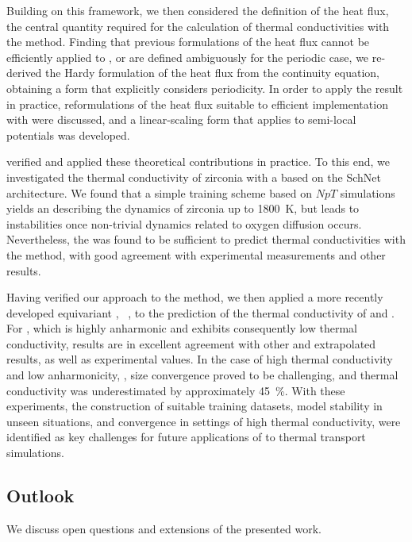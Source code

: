 Building on this framework, we then considered the definition of the heat flux, the central quantity required for the calculation of thermal conductivities with the \gk method.
Finding that previous formulations of the heat flux cannot be efficiently applied to \glps, or are defined ambiguously for the periodic case, we re-derived the Hardy formulation of the heat flux from the continuity equation, obtaining a form that explicitly considers periodicity.
In order to apply the result in practice, reformulations of the heat flux suitable to efficient implementation with \ad were discussed, and a linear-scaling  form that applies to semi-local potentials was developed.

 verified and applied these theoretical contributions in practice. To this end, we investigated the thermal conductivity of zirconia with a \glp based on the SchNet~\cite{sktm2017q,sstm2018q} \mpnn architecture. We found that a simple training scheme based on $NpT$ \md simulations yields an \mlp describing the dynamics of zirconia up to \qty{1800}{K}, but leads to instabilities once non-trivial dynamics related to oxygen diffusion occurs.
Nevertheless, the \mlp was found to be sufficient to predict thermal conductivities with the \gk method, with good agreement with experimental measurements and other \mlp results.

Having verified our approach to the \gk method, we then applied a more recently developed equivariant \glp, \sok~\cite{fum2022q}, to the prediction of the thermal conductivity of  and . For , which is highly anharmonic and exhibits consequently low thermal conductivity, \sok results are in excellent agreement with other \mlps and extrapolated \dft results, as well as experimental values. In the case of high thermal conductivity and low anharmonicity, , size convergence proved to be challenging, and thermal conductivity was underestimated by approximately \qty{45}{\percent}. With these experiments, the construction of suitable training datasets, model stability in unseen situations, and convergence in settings of high thermal conductivity, were identified as key challenges for future applications of \glps to thermal transport simulations.

\subsection{Outlook}

\noindent
We discuss open questions and extensions of the presented work.


